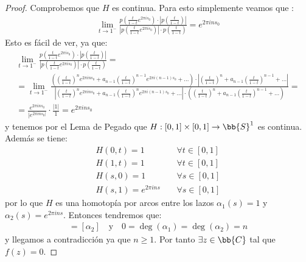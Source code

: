 \begin{teo}
\begin{proof}
        Comprobemos que $H$ es continua. Para esto simplemente veamos que :
        \begin{gather*}
            \lim_{t\to 1^-}\frac{p\left(\frac{t}{1-t} e^{2\pi i s_0}\right) \cdot \left|p\left(\frac{t}{1-t}\right)\right|}{\left|p\left(\frac{t}{1-t} e^{2\pi i s_0}\right)\right| \cdot p\left(\frac{t}{1-t}\right)} = e^{2 \pi i n s_0}
        \end{gather*}
        Esto es fácil de ver, ya que:
        \begin{gather*}
            \lim_{t\to 1^-}\frac{p\left(\frac{t}{1-t} e^{2\pi i s_0}\right) \cdot \left|p\left(\frac{t}{1-t}\right)\right|}{\left|p\left(\frac{t}{1-t} e^{2\pi i s_0}\right)\right| \cdot p\left(\frac{t}{1-t}\right)} =\\
            = \lim_{t\to 1^-} \frac{\left(\left(\frac{t}{1-t}\right)^n e^{2\pi i n s_0} + a_{n-1} \left(\frac{t}{1-t}\right)^{n-1} e^{2\pi i (n-1) s_0} + \dots\right) \cdot \left|\left(\frac{t}{1-t}\right)^n + a_{n-1} \left(\frac{t}{1-t}\right)^{n-1}  + \dots\right|  }%
            {\left|\left(\frac{t}{1-t}\right)^n e^{2\pi i n s_0} + a_{n-1} \left(\frac{t}{1-t}\right)^n e^{2\pi i (n-1) s_0} + \dots\right| \cdot \left(\left(\frac{t}{1-t}\right)^n + a_{n-1} \left(\frac{t}{1-t}\right)^{n-1}  + \dots\right)} = \\
            = \frac{e^{2\pi i n s_0}}{|e^{2\pi i n s_0|}} \cdot \frac{|1|}{1} = e^{2\pi i n s_0}
        \end{gather*}
        y tenemos por el Lema de Pegado que $H:[0,1]\times [0,1]\to \bb{S}^1$ es continua. Además se tiene:
        \begin{align*}
            H(0,t) = 1\ \ \ \ \ & \forall t\in [0,1]\\
            H(1,t) = 1\ \ \ \ \  & \forall t\in [0,1]\\
            H(s,0) = 1\ \ \ \ \  & \forall s\in [0,1]\\
            H(s,1) = e^{2\pi i n s} \ \ \ \ \ & \forall s\in [0,1]
        \end{align*}
        por lo que $H$ es una homotopía por arcos entre los lazos $\alpha_1(s) = 1$ y $\alpha_2(s) = e^{2\pi i n s}$. Entonces tendremos que: 
        \begin{gather*}
            [\alpha_1] = [\alpha_2] \ \ \ \text{ y } \ \ \ 0 = \deg(\alpha_1) = \deg(\alpha_2) = n
        \end{gather*}
        y llegamos a contradicción ya que $n\geq 1$. Por tanto $\exists z \in \bb{C}$ tal que $f(z) = 0$.
    \end{proof}
\end{teo}

